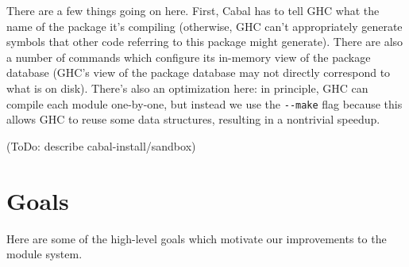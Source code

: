 \documentclass{article}
\begin{document}
There are a few things going on here.  First, Cabal has to tell GHC
what the name of the package it's compiling (otherwise, GHC can't appropriately
generate symbols that other code referring to this package might generate).
There are also a number of commands which configure its in-memory view of
the package database (GHC's view of the package database may not directly
correspond to what is on disk).  There's also an optimization here: in principle,
GHC can compile each module one-by-one, but instead we use the \verb|--make| flag
because this allows GHC to reuse some data structures, resulting in a nontrivial
speedup.

(ToDo: describe cabal-install/sandbox)

\section{Goals}

Here are some of the high-level goals which motivate our improvements to
the module system.
\end{document}
